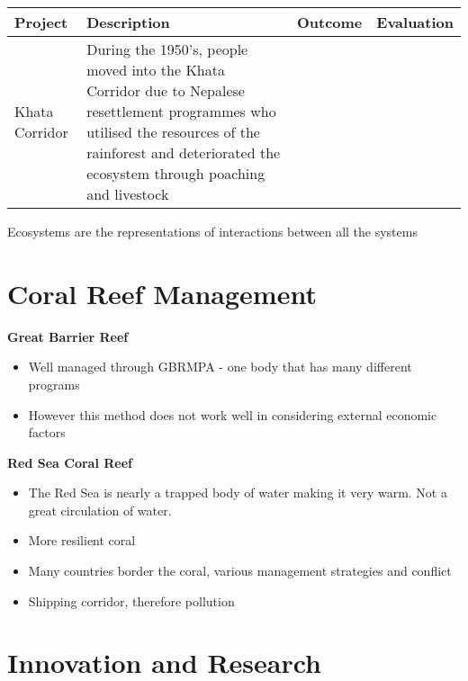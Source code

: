 	\begin{table}[H]
		\centering
		\begin{tabular}{p{3cm}|p{4.5cm}|p{4.5cm}|p{4.5cm}}
			\textbf{Project}	& \textbf{Description}		& \textbf{Outcome}		& \textbf{Evaluation}	\\ \hline
			Khata Corridor		& During the 1950's, people moved into the Khata Corridor due to Nepalese resettlement programmes who utilised the resources of the rainforest and deteriorated the ecosystem through poaching and livestock \\
		\end{tabular}
	\end{table}

	Ecosystems are the representations of interactions between all the systems

\section{Coral Reef Management}

	\textbf{Great Barrier Reef}

		\begin{itemize}
			\item Well managed through GBRMPA - one body that has many different programs
			\item However this method does not work well in considering external economic factors
		\end{itemize}

	\textbf{Red Sea Coral Reef}

	\begin{itemize}
		\item The Red Sea is nearly a trapped body of water making it very warm. Not a great circulation of water.
		\item More resilient coral
		\item Many countries border the coral, various management strategies and conflict
		\item Shipping corridor, therefore pollution
	\end{itemize}

\section{Innovation and Research}

